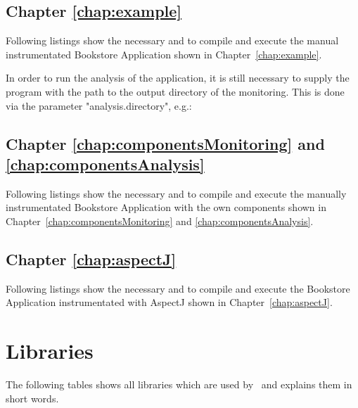     \subsection{Chapter \ref{chap:example}}
      Following listings show the necessary  and  to compile and execute the manual instrumentated Bookstore Application shown in Chapter~\ref{chap:example}.
      \setXMLListing
      
      
      In order to run the analysis of the application, it is still necessary to supply the program with the path to the output directory of the monitoring. This is done via the parameter "analysis.directory", e.g.:
      \setBashListing
      

    \subsection{Chapter \ref{chap:componentsMonitoring} and \ref{chap:componentsAnalysis}}
      Following listings show the necessary  and  to compile and execute the manually instrumentated Bookstore Application with the own components shown in Chapter~\ref{chap:componentsMonitoring} and \ref{chap:componentsAnalysis}.
      \setXMLListing
      
      

    \subsection{Chapter \ref{chap:aspectJ}}
      Following listings show the necessary  and  to compile and execute the Bookstore Application instrumentated with AspectJ shown in Chapter~\ref{chap:aspectJ}.
      \setXMLListing
      
           

\newpage
  \section{Libraries}
    The following tables shows all libraries which are used by \Kieker\ and explains them in short words.
    

